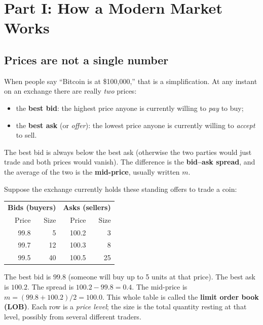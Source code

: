 \documentclass[11pt]{article}
\begin{document}
\section{Part I: How a Modern Market Works}

\subsection{Prices are not a single number}
When people say ``Bitcoin is at \$100{,}000,'' that is a simplification. At any instant on an exchange there are really \emph{two} prices:
\begin{itemize}
\item the \textbf{best bid}: the highest price anyone is currently willing to \emph{pay} to buy;
\item the \textbf{best ask} (or \emph{offer}): the lowest price anyone is currently willing to \emph{accept} to sell.
\end{itemize}
The best bid is always below the best ask (otherwise the two parties would just trade and both prices would vanish). The difference is the \textbf{bid--ask spread}, and the average of the two is the \textbf{mid-price}, usually written $m$.

\begin{example}
Suppose the exchange currently holds these standing offers to trade a coin:
\begin{center}
\begin{tabular}{rr|rr}
\toprule
\multicolumn{2}{c|}{\textbf{Bids (buyers)}} & \multicolumn{2}{c}{\textbf{Asks (sellers)}}\\
Price & Size & Price & Size\\
\midrule
99.8 & 5 & 100.2 & 3\\
99.7 & 12 & 100.3 & 8\\
99.5 & 40 & 100.5 & 25\\
\bottomrule
\end{tabular}
\end{center}
The best bid is $99.8$ (someone will buy up to 5 units at that price). The best ask is $100.2$. The spread is $100.2-99.8=0.4$. The mid-price is $m=(99.8+100.2)/2=100.0$. This whole table is called the \textbf{limit order book (LOB)}. Each row is a \emph{price level}; the size is the total quantity resting at that level, possibly from several different traders.
\end{example}
\end{document}
